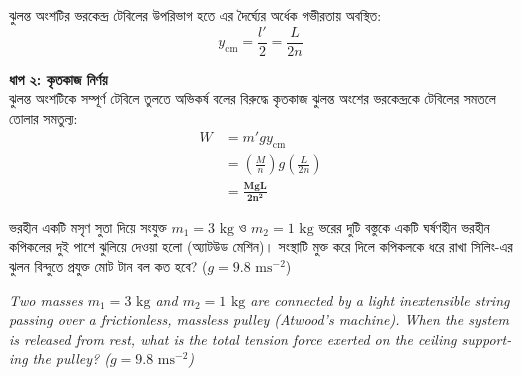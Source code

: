\documentclass[12pt, a4paper]{article}
\begin{document}
{\begin{tcolorbox}[solutionbox={সমাধান (Solution)}]
    ঝুলন্ত অংশটির ভরকেন্দ্র টেবিলের উপরিভাগ হতে এর দৈর্ঘ্যের অর্ধেক গভীরতায় অবস্থিত:
    \[ y_{\text{cm}} = \frac{l'}{2} = \frac{L}{2n} \]
    
    \vspace{0.5em}
    \noindent\textbf{ধাপ ২: কৃতকাজ নির্ণয়} \\
    ঝুলন্ত অংশটিকে সম্পূর্ণ টেবিলে তুলতে অভিকর্ষ বলের বিরুদ্ধে কৃতকাজ ঝুলন্ত অংশের ভরকেন্দ্রকে টেবিলের সমতলে তোলার সমতুল্য:
    \begin{align*}
        W &= m' g y_{\text{cm}} \\
          &= \left(\frac{M}{n}\right) g \left(\frac{L}{2n}\right) \\
          &= \mathbf{\frac{MgL}{2n^2}}
    \end{align*}
\end{tcolorbox}
\newpage

\begin{tcolorbox}[questionbox={প্রশ্ন (Question) 9}]
    \noindent
    ভরহীন একটি মসৃণ সুতা দিয়ে সংযুক্ত $m_1 = 3\text{ kg}$ ও $m_2 = 1\text{ kg}$ ভরের দুটি বস্তুকে একটি ঘর্ষণহীন ভরহীন কপিকলের দুই পাশে ঝুলিয়ে দেওয়া হলো (অ্যাটউড মেশিন)। সংস্থাটি মুক্ত করে দিলে কপিকলকে ধরে রাখা সিলিং-এর ঝুলন বিন্দুতে প্রযুক্ত মোট টান বল কত হবে? ($g = 9.8\text{ ms}^{-2}$)
    
    \vspace{0.8em}
    \begin{english}
    \noindent\textit{\color{darkgray}
    Two masses $m_1 = 3\text{ kg}$ and $m_2 = 1\text{ kg}$ are connected by a light inextensible string passing over a frictionless, massless pulley (Atwood's machine). When the system is released from rest, what is the total tension force exerted on the ceiling supporting the pulley? ($g = 9.8\text{ ms}^{-2}$)
    }
    \end{english}
\end{tcolorbox}

\vspace{1em}
\begin{center}
\end{center}}
\end{document}
